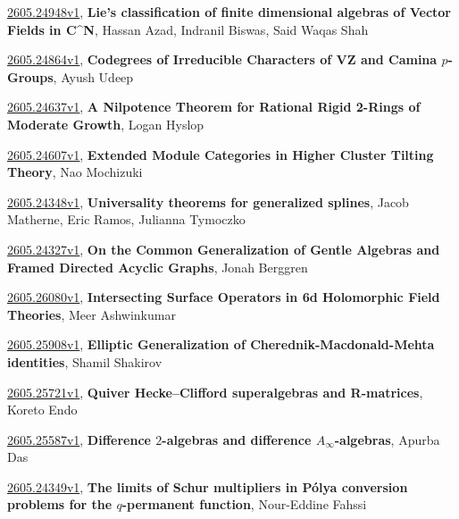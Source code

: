 \documentclass[9pt, a4paper]{article}
\theoremstyle{plain}
\theoremstyle{definition}
\theoremstyle{remark}
\newcommand{\arxiv}[3]{\href{https://arxiv.org/abs/#1}{#1}, \textbf{\textcolor{arxivblue}{#2}}, #3}
\begin{document}
\arxiv{2605.24948v1}{Lie's classification of finite dimensional algebras of Vector Fields in C^N}{Hassan Azad, Indranil Biswas, Said Waqas Shah}

\arxiv{2605.24864v1}{Codegrees of Irreducible Characters of VZ and Camina $p$-Groups}{Ayush Udeep}

\arxiv{2605.24637v1}{A Nilpotence Theorem for Rational Rigid 2-Rings of Moderate Growth}{Logan Hyslop}

\arxiv{2605.24607v1}{Extended Module Categories in Higher Cluster Tilting Theory}{Nao Mochizuki}

\arxiv{2605.24348v1}{Universality theorems for generalized splines}{Jacob Matherne, Eric Ramos, Julianna Tymoczko}

\arxiv{2605.24327v1}{On the Common Generalization of Gentle Algebras and Framed Directed Acyclic Graphs}{Jonah Berggren}

\arxiv{2605.26080v1}{Intersecting Surface Operators in 6d Holomorphic Field Theories}{Meer Ashwinkumar}

\arxiv{2605.25908v1}{Elliptic Generalization of Cherednik-Macdonald-Mehta identities}{Shamil Shakirov}

\arxiv{2605.25721v1}{Quiver Hecke--Clifford superalgebras and R-matrices}{Koreto Endo}

\arxiv{2605.25587v1}{Difference $2$-algebras and difference $A_\infty$-algebras}{Apurba Das}

\arxiv{2605.24349v1}{The limits of Schur multipliers in Pólya conversion problems for the $q$-permanent function}{Nour-Eddine Fahssi}

\end{document}
